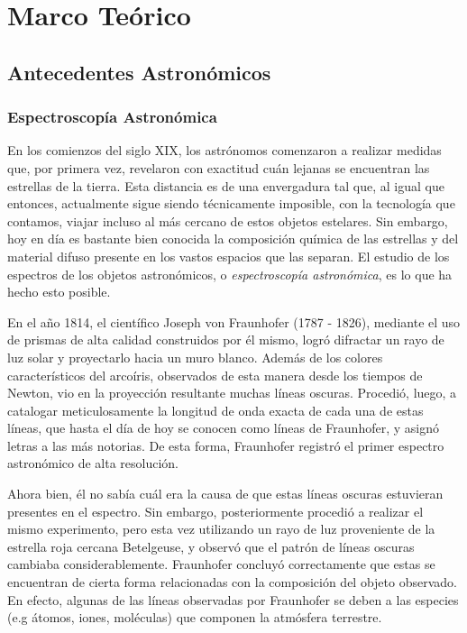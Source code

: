 \chapter{Marco Teórico}


\section{Antecedentes Astronómicos}

\subsection{Espectroscopía Astronómica}

En los comienzos del siglo XIX, los astrónomos comenzaron a realizar medidas que, por primera vez, revelaron con exactitud cuán lejanas se encuentran las estrellas de la tierra. Esta distancia es de una envergadura tal que, al igual que entonces, actualmente sigue siendo técnicamente imposible, con la tecnología que contamos, viajar incluso al más cercano de estos objetos estelares. Sin embargo, hoy en día es bastante bien conocida la composición química de las estrellas y del material difuso presente en los vastos espacios que las separan. El estudio de los espectros de los objetos astronómicos, o \emph{espectroscopía astronómica}, es lo que ha hecho esto posible.

En el año 1814, el científico Joseph von Fraunhofer (1787 - 1826), mediante el uso de prismas de alta calidad construidos por él mismo, logró difractar un rayo de luz solar y proyectarlo hacia un muro blanco. Además de los colores característicos del arcoíris, observados de esta manera desde los tiempos de Newton, vio en la proyección resultante muchas líneas oscuras. Procedió, luego, a catalogar meticulosamente la longitud de onda exacta de cada una de estas líneas, que hasta el día de hoy se conocen como líneas de Fraunhofer, y asignó letras a las más notorias. De esta forma, Fraunhofer registró el primer espectro astronómico de alta resolución.

Ahora bien, él no sabía cuál era la causa de que estas líneas oscuras estuvieran presentes en el espectro. Sin embargo, posteriormente procedió a realizar el mismo experimento, pero esta vez utilizando un rayo de luz proveniente de la estrella roja cercana Betelgeuse, y observó que el patrón de líneas oscuras cambiaba considerablemente. Fraunhofer concluyó correctamente que estas se encuentran de cierta forma relacionadas con la composición del objeto observado. En efecto, algunas de las líneas observadas por Fraunhofer se deben a las especies (e.g átomos, iones, moléculas) que componen la atmósfera terrestre.

